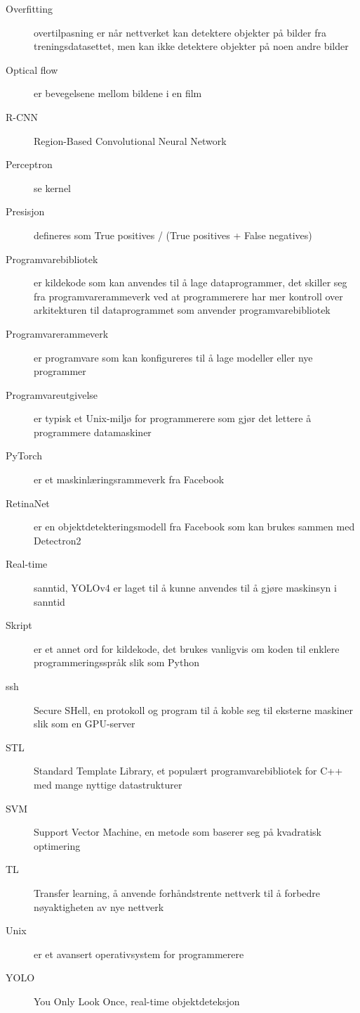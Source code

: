 \begin{description}
\item[Overfitting] overtilpasning er når nettverket kan detektere objekter på bilder fra treningsdatasettet, men kan ikke detektere objekter på noen andre bilder
\item[Optical flow] er bevegelsene mellom bildene i en film
\item[R-CNN] Region-Based Convolutional Neural Network
\item[Perceptron] se kernel
\item[Presisjon] defineres som True positives / (True positives + False negatives)
\item[Programvarebibliotek] er kildekode som kan anvendes til å lage dataprogrammer, det skiller seg fra programvarerammeverk ved at programmerere har mer kontroll over arkitekturen til dataprogrammet som anvender programvarebibliotek
\item[Programvarerammeverk] er programvare som kan konfigureres til å lage modeller eller nye programmer
\item[Programvareutgivelse] er typisk et Unix-miljø for programmerere som gjør det lettere å programmere datamaskiner
\item[PyTorch] er et maskinlæringsrammeverk fra Facebook
\item[RetinaNet] er en objektdetekteringsmodell fra Facebook som kan brukes sammen med Detectron2
\item[Real-time] sanntid, YOLOv4 er laget til å kunne anvendes til å gjøre maskinsyn i sanntid
\item[Skript] er et annet ord for kildekode, det brukes vanligvis om koden til enklere programmeringsspråk slik som Python
\item[ssh] Secure SHell, en protokoll og program til å koble seg til eksterne maskiner slik som en GPU-server
\item[STL] Standard Template Library, et populært programvarebibliotek for C++ med mange nyttige datastrukturer
\item[SVM] Support Vector Machine, en metode som baserer seg på kvadratisk optimering
\item[TL] Transfer learning, å anvende forhåndstrente nettverk til å forbedre nøyaktigheten av nye nettverk
\item[Unix] er et avansert operativsystem for programmerere
\item[YOLO] You Only Look Once, real-time objektdeteksjon


\end{description}